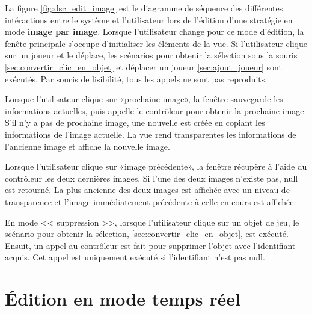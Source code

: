 
La figure \ref{fig:dsc_edit_image} est le diagramme de séquence des différentes intéractions entre le système et l'utilisateur lors de l'édition d'une stratégie en mode \textbf{image par image}.
Lorsque l'utilisateur change pour ce mode d'édition, la fenête principale s'occupe d'initialiser les éléments de la vue.
Si l'utilisateur clique sur un joueur et le déplace, les scénarios pour obtenir la sélection sous la souris \ref{sec:convertir_clic_en_objet} et déplacer un joueur \ref{sec:ajout_joueur} sont exécutés.
Par soucis de lisibilité, tous les appels ne sont pas reproduits.

Lorsque l'utilisateur clique sur «prochaine image», la fenêtre sauvegarde les informations actuelles, puis appelle le contrôleur pour obtenir la prochaine image.
S'il n'y a pas de prochaine image, une nouvelle est créée en copiant les informations de l'image actuelle.
La vue rend transparentes les informations de l'ancienne image et affiche la nouvelle image.

Lorsque l'utilisateur clique sur «image précédente», la fenêtre récupère à l'aide du contrôleur les deux dernières images.
Si l'une des deux images n'existe pas, null est retourné.
La plus ancienne des deux images est affichée avec un niveau de transparence et l'image immédiatement précédente à celle en cours est affichée.

En mode << suppression >>, lorsque l'utilisateur clique sur un objet de jeu, le scénario pour obtenir la sélection, \ref{sec:convertir_clic_en_objet}, est exécuté.
Ensuit, un appel au contrôleur est fait pour supprimer l'objet avec l'identifiant acquis.
Cet appel est uniquement exécuté si l'identifiant n'est pas null.

\section{Édition en mode temps réel}
\label{sec:edition_temps_reel}


